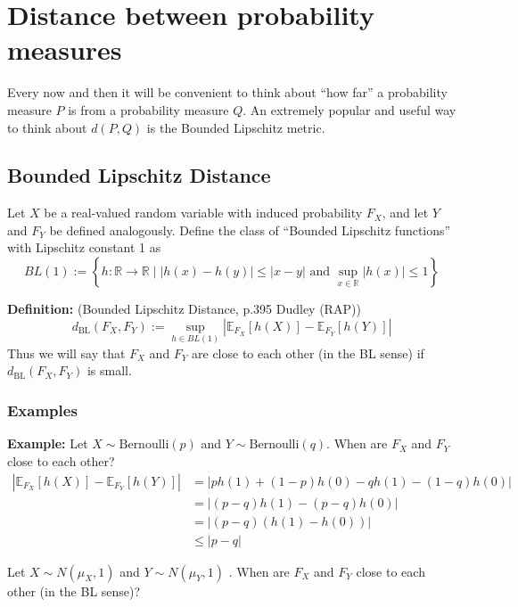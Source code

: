 \documentclass[11pt]{article} %
\begin{document}
\section{Distance between probability measures}

Every now and then it will be convenient to think about ``how far'' a probability measure $P$ is from a probability measure $Q$. An extremely popular and useful way to think about $d(P,Q)$ is the Bounded Lipschitz metric.

\subsection{Bounded Lipschitz Distance}

Let $X$ be a real-valued random variable with induced probability $F_X$, and let $Y$ and $F_Y$ be defined analogously. Define the class of ``Bounded Lipschitz functions'' with Lipschitz constant 1 as
\begin{equation}
	BL(1) := \left\{ h : \mathbb{R} \to \mathbb{R} \mid | h (x) - h(y) | \leq | x - y | \text{ and } \sup_{x \in \mathbb{R}} | h(x) | \leq 1 \right\}
\end{equation}

\textbf{Definition:} (Bounded Lipschitz Distance, p.395 Dudley (RAP))
\begin{equation}
	d_{\text{BL}} (F_X, F_Y) := \sup_{h \in BL(1)} \left| \mathbb{E}_{F_X} [ h(X)] - \mathbb{E}_{F_Y} [h(Y)] \right| 
\end{equation}
Thus we will say that $F_X$ and $F_Y$ are close to each other (in the BL sense) if $d_{\text{BL}} (F_X, F_Y)$ is small.

\subsubsection{Examples}

\textbf{Example:} Let $X \sim \text{Bernoulli} (p)$ and $Y \sim \text{Bernoulli} (q)$. When are $F_X$ and $F_Y$ close to each other?
\begin{align*}
	\left| \mathbb{E}_{F_X} [ h(X)] - \mathbb{E}_{F_Y} [h(Y)] \right| &= \left| p h(1) + (1-p) h(0) - q h(1) - (1-q) h(0) \right| \\
	&= \left| (p-q) h(1) - (p-q) h(0) \right| \\
	&= \left| (p-q)( h(1) - h(0)) \right| \\
	&\leq | p - q |
\end{align*}

 Let $X \sim N (\mu_X, 1)$ and $Y \sim N (\mu_Y, 1)$ . When are $F_X$ and $F_Y$ close to each other (in the BL sense)?
\end{document}
